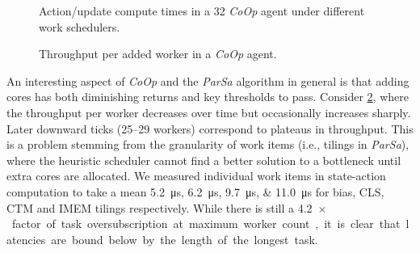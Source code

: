 \documentclass[sigconf,natbib=false]{acmart}
\newcommand{\Coopfw}{\emph{CoOp}}
\begin{document}
\begin{figure}
	\caption{Action/update compute times in a \SI{32}{\bit} \Coopfw{} agent under different work schedulers.\label{fig:work-alloc-32}}
\end{figure}

\begin{figure}
	\caption{Throughput per added worker in a \Coopfw{} agent.\label{fig:tput-per-core}}
\end{figure}

An interesting aspect of \Coopfw{} and the \emph{ParSa} algorithm in general is that adding cores has both diminishing returns and key thresholds to pass.
Consider \cref{fig:tput-per-core}, where the throughput per worker decreases over time but occasionally increases sharply.
Later downward ticks (\numrange{25}{29} workers) correspond to plateaus in throughput.
This is a problem stemming from the granularity of work items (i.e., tilings in \emph{ParSa}), where the heuristic scheduler cannot find a better solution to a bottleneck until extra cores are allocated.
We measured individual work items in state-action computation to take a mean \SIlist{5.2; 6.2; 9.7; 11.0}{\micro\second} for bias, CLS, CTM and IMEM tilings respectively.
While there is still a \SI{4.2}{$\times$} factor of task oversubscription at maximum worker count, it is clear that latencies are bound below by the length of the longest task.
\end{document}
